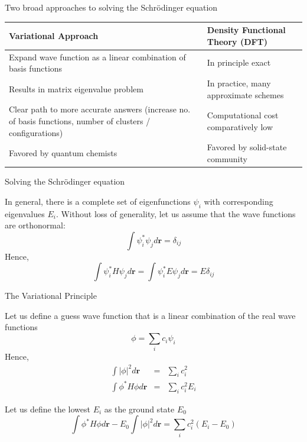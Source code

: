 \documentclass[aspectratio=169]{beamer}
\let \vec \mathbf
\begin{document}
\begin{frame}{Two broad approaches to solving the Schr\"odinger equation}

\begin{table}[]
    \centering
    \begin{tabular}{p{7cm}|p{7cm}}
        \textbf{Variational Approach} & \textbf{Density Functional Theory (DFT)}  \\
        \hline\hline
        Expand wave function as a linear combination of basis functions & In principle exact\\
        \hline
        Results in matrix eigenvalue problem & In practice, many approximate schemes\\
        \hline
        Clear path to more accurate answers (increase no. of basis functions, number of clusters / configurations) & Computational cost comparatively low\\
        \hline
        Favored by quantum chemists & Favored by solid-state community\\
    \end{tabular}
\end{table}
    
\end{frame}

\begin{frame}{Solving the Schr\"odinger equation}

In general, there is a complete set of eigenfunctions $\psi_i$ with corresponding eigenvalues $E_i$. Without loss of generality, let us assume that the wave functions are orthonormal:
\begin{equation*}
    \int \psi_i^*\psi_j d\vec{r} = \delta_{ij}
\end{equation*}
    Hence,
    \begin{equation*}
    \int \psi_i^*H\psi_j d\vec{r} = \int \psi_i^*E\psi_j d\vec{r}=E\delta_{ij}
\end{equation*}
\end{frame}


\begin{frame}{The Variational Principle}

Let us define a guess wave function that is a linear combination of the real wave functions
\begin{equation*}
    \phi = \sum_i c_i\psi_i
\end{equation*}
    Hence,
    \begin{eqnarray*}
    \int |\phi|^2 d\vec{r} & = & \sum_i c_i^2\\
    \int \phi^* H \phi d\vec{r} & = & \sum_i c_i^2E_i
    \end{eqnarray*}


Let us define the lowest $E_i$ as the ground state $E_0$
\begin{equation*}
    \int \phi^* H \phi d\vec{r} - E_0 \int |\phi|^2 d\vec{r} =  \sum_i c_i^2(E_i-E_0)
\end{equation*}
\end{frame}
\end{document}

